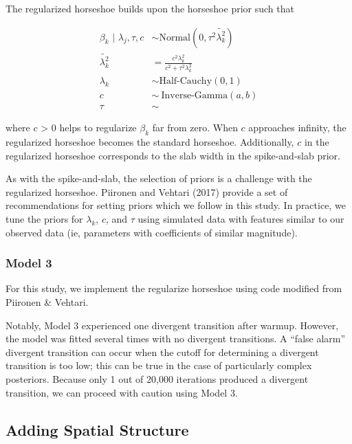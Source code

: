 \documentclass[]{article}
\begin{document}
The regularized horseshoe builds upon the horseshoe prior such that

\[
\begin{aligned}
\beta_k \text{ | } \lambda_j, \tau, c & \sim \text{Normal}(0, \tau^2 \tilde{\lambda_k^2}) \\
\tilde{\lambda_k^2} & = \frac{c^2\lambda_k^2}{c^2 + \tau^2\lambda_k^2} \\
\lambda_k & \sim \text{Half-Cauchy}(0, 1) \\
c & \sim ~ \text{Inverse-Gamma}(a, b) \\
\tau & \sim 
\end{aligned}
\]

where \(c\) \textgreater{} 0 helps to regularize \(\beta_k\) far from
zero. When \(c\) approaches infinity, the regularized horseshoe becomes
the standard horseshoe. Additionally, \(c\) in the regularized horseshoe
corresponds to the slab width in the spike-and-slab prior.

As with the spike-and-slab, the selection of priors is a challenge with
the regularized horseshoe. Piironen and Vehtari (2017) provide a set of
recommendations for setting priors which we follow in this study. In
practice, we tune the priors for \(\lambda_k\), \(c\), and \(\tau\)
using simulated data with features similar to our observed data (ie,
parameters with coefficients of similar magnitude).

\subsubsection{Model 3}\label{model-3}

For this study, we implement the regularize horseshoe using code
modified from Piironen \& Vehtari.

Notably, Model 3 experienced one divergent transition after warmup.
However, the model was fitted several times with no divergent
transitions. A ``false alarm'' divergent transition can occur when the
cutoff for determining a divergent transition is too low; this can be
true in the case of particularly complex posteriors. Because only 1 out
of 20,000 iterations produced a divergent transition, we can proceed
with caution using Model 3.

\subsection{Adding Spatial Structure}\label{adding-spatial-structure}
\end{document}
